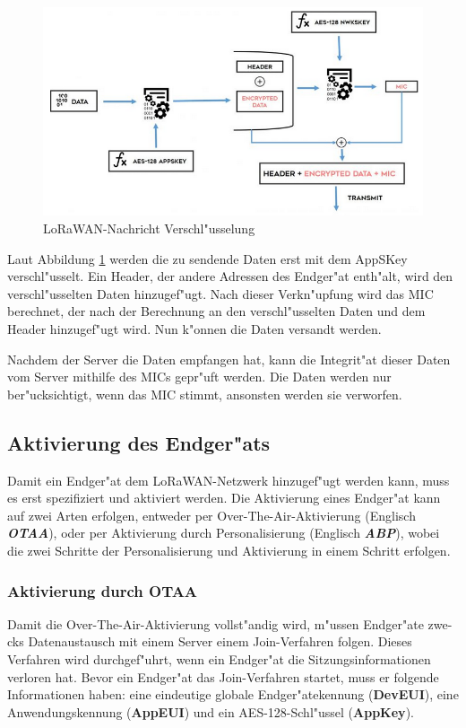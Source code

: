 \begin{figure}[h]
	\centering
	\includegraphics[width=14cm]{source/images/WAN}
	\caption{LoRaWAN-Nachricht Verschl"usselung 
		\cite{Entcription}\label{fig:Entcription}}
\end{figure}

Laut Abbildung \ref{fig:Entcription} werden die zu sendende Daten erst 
mit dem AppSKey verschl"usselt. Ein Header, der andere Adressen des 
Endger"at enth"alt, wird den verschl"usselten Daten hinzugef"ugt. 
Nach dieser Verkn"upfung wird das MIC berechnet, der nach der 
Berechnung an den verschl"usselten Daten und dem Header hinzugef"ugt 
wird. Nun k"onnen die Daten versandt werden. 

Nachdem der Server die Daten empfangen hat, kann die Integrit"at 
dieser Daten vom Server mithilfe des MICs gepr"uft werden. Die Daten 
werden nur ber"ucksichtigt, wenn das MIC stimmt, ansonsten werden sie 
verworfen.  

\subsection{Aktivierung des Endger"ats}
Damit ein Endger"at dem LoRaWAN-Netzwerk hinzugef"ugt werden kann, 
muss es erst spezifiziert und aktiviert werden. Die Aktivierung eines 
Endger"at kann auf zwei Arten erfolgen, entweder per 
Over-The-Air-Aktivierung (Englisch \textbf{\textit{\ac{OTAA}}}), oder 
per Aktivierung durch Personalisierung (Englisch 
\textbf{\textit{\ac{ABP}}}), wobei die zwei Schritte der 
Personalisierung und Aktivierung in einem Schritt erfolgen. 

\subsubsection{Aktivierung durch OTAA}
Damit die Over-The-Air-Aktivierung vollst"andig wird, m"ussen 
Endger"ate zwe-cks Datenaustausch mit einem Server einem Join-Verfahren 
folgen. Dieses Verfahren wird durchgef"uhrt, wenn ein Endger"at die Sitzungsinformationen verloren hat.
Bevor ein Endger"at das Join-Verfahren startet, muss er folgende 
Informationen haben: eine eindeutige globale Endger"atekennung 
(\textbf{DevEUI}), eine Anwendungskennung (\textbf{AppEUI}) und ein 
AES-128-Schl"ussel (\textbf{AppKey}). 


